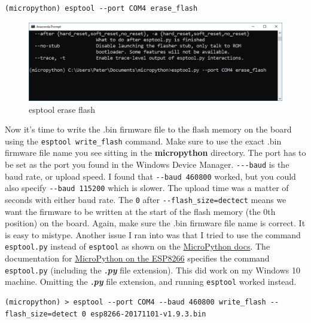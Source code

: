 \documentclass{book}
\makeatletter
\def\maxwidth{\ifdim\Gin@nat@width>\linewidth\linewidth
    \else\Gin@nat@width\fi}
\let\Oldincludegraphics\includegraphics
\renewcommand{\includegraphics}[1]{\Oldincludegraphics[width=.8\maxwidth]{#1}}
\makeatother
\begin{document}
\begin{lstlisting}
(micropython) esptool --port COM4 erase_flash
\end{lstlisting}

\begin{figure}
\centering
\includegraphics{images/esptool_erase_flash.PNG}
\caption{esptool erase flash}
\end{figure}

Now it's time to write the .bin firmware file to the flash memory on the
board using the \lstinline!esptool write_flash! command. Make sure to
use the exact .bin firmware file name you see sitting in the
\textbf{micropython} directory. The port has to be set as the port you
found in the Windows Device Manager. \lstinline!---baud! is the baud
rate, or upload speed. I found that \lstinline!--baud 460800! worked,
but you could also specify \lstinline!--baud 115200! which is slower.
The upload time was a matter of seconds with either baud rate. The
\lstinline!0! after \lstinline!--flash_size=dectect! means we want the
firmware to be written at the start of the flash memory (the 0th
position) on the board. Again, make sure the .bin firmware file name is
correct. It is easy to mistype. Another issue I ran into was that I
tried to use the command \lstinline!esptool.py! instead of
\lstinline!esptool! as shown on the
\href{https://docs.micropython.org/en/latest/esp8266/esp8266/tutorial/intro.html\#deploying-the-firmware}{MicroPython
docs}. The documentation for
\href{https://docs.micropython.org/en/latest/esp8266/esp8266/tutorial/intro.html\#deploying-the-firmware}{MicroPython
on the ESP8266} specifies the command \lstinline!esptool.py! (including
the \textbf{\emph{.py}} file extension). This did work on my Windows 10
machine. Omitting the \textbf{\emph{.py}} file extension, and running
\lstinline!esptool! worked instead.

\begin{lstlisting}
(micropython) > esptool --port COM4 --baud 460800 write_flash --flash_size=detect 0 esp8266-20171101-v1.9.3.bin
\end{lstlisting}
\end{document}
